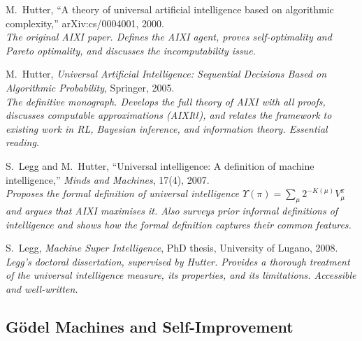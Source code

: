 \documentclass[11pt,a4paper]{article}
\theoremstyle{definition}
\theoremstyle{remark}
\begin{document}
\begin{description}[style=nextline, leftmargin=1.5em]

\item[\textmd{[Hutter, 2000]}]
M.~Hutter,
``A theory of universal artificial intelligence based on algorithmic
complexity,'' arXiv:cs/0004001, 2000.\\
\textit{The original AIXI paper.  Defines the AIXI agent, proves
self-optimality and Pareto optimality, and discusses the incomputability
issue.}

\item[\textmd{[Hutter, 2005]}]
M.~Hutter,
\emph{Universal Artificial Intelligence: Sequential Decisions Based on
Algorithmic Probability}, Springer, 2005.\\
\textit{The definitive monograph.  Develops the full theory of AIXI with
all proofs, discusses computable approximations (AIXI$tl$), and relates
the framework to existing work in RL, Bayesian inference, and information
theory.  Essential reading.}

\item[\textmd{[Legg \& Hutter, 2007]}]
S.~Legg and M.~Hutter,
``Universal intelligence: A definition of machine intelligence,''
\emph{Minds and Machines}, 17(4), 2007.\\
\textit{Proposes the formal definition of universal intelligence
$\Upsilon(\pi)=\sum_\mu 2^{-K(\mu)}V_\mu^\pi$ and argues that AIXI
maximises it.  Also surveys prior informal definitions of intelligence
and shows how the formal definition captures their common features.}

\item[\textmd{[Legg, 2008]}]
S.~Legg,
\emph{Machine Super Intelligence}, PhD thesis, University of Lugano, 2008.\\
\textit{Legg's doctoral dissertation, supervised by Hutter.  Provides
a thorough treatment of the universal intelligence measure, its properties,
and its limitations.  Accessible and well-written.}

\end{description}

\subsection*{G\"odel Machines and Self-Improvement}
\end{document}
